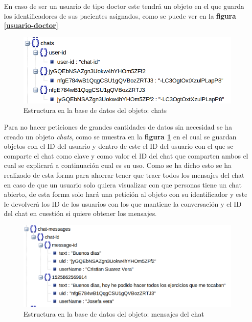 En caso de ser un usuario de tipo doctor este tendrá un objeto en el que
guarda los identificadores de sus pacientes asignados, como se puede ver
en la \textbf{figura \ref{usuario-doctor}}

\medskip
\begin{figure}
    \includegraphics[width=\linewidth]{./images/database/chats-database.png}
    \caption{Estructura en la base de datos del objeto: chats}
    \label{chat}
\end{figure}

Para no hacer peticiones de grandes cantidades de datos sin necesidad
se ha creado un objeto \textit{chats}, como se muestra en la
\textbf{figura \ref{chat}} en el cual se guardan
objetos con el ID del usuario y dentro de este el ID del usuario con el
que se comparte el chat como clave y como valor el ID del chat que comparten
ambos el cual se explicará a continuación cual es su uso. Como se ha dicho
esto se ha realizado de esta forma para ahorrar tener que traer todos los
mensajes del chat en caso de que un usuario solo quiera visualizar con
que personas tiene un chat abierto, de esta forma solo hará una petición
al objeto con su identificador y este le devolverá los ID de los usuarios
con los que mantiene la conversación y el ID del chat en cuestión si quiere
obtener los mensajes.

\medskip
\begin{figure}
    \includegraphics[width=\linewidth]{./images/database/chat-messages-database.png}
    \caption{Estructura en la base de datos del objeto: mensajes del chat}
    \label{mensajes-del-chat}
\end{figure}

